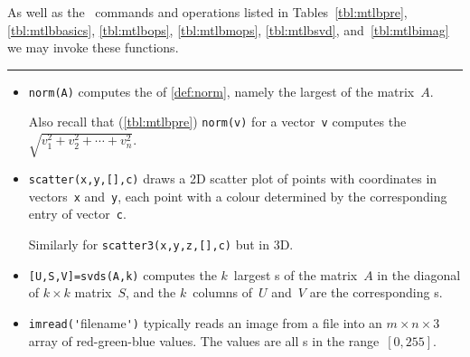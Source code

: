 \begin{table}
\caption{As well as the \script\ commands and operations listed in Tables~\ref{tbl:mtlbpre}, \ref{tbl:mtlbbasics}, \ref{tbl:mtlbops}, \ref{tbl:mtlbmops}, \ref{tbl:mtlbsvd}, and~\ref{tbl:mtlbimag}  we may invoke these functions.} \label{tbl:mtlbnorm}
\hrule
\begin{minipage}{\linewidth}
\begin{itemize}
\item {}\verb|norm(A)| computes the  of \autoref{def:norm}, namely the largest  of the matrix~\(A\).

Also recall that (\autoref{tbl:mtlbpre}) \verb|norm(v)| for a vector~\verb|v| computes the  \(\sqrt{v_1^2+v_2^2+\cdots+v_n^2}\).



\item {}\verb|scatter(x,y,[],c)| draws a 2D scatter plot of points with coordinates in vectors~\verb|x| and~\verb|y|, each point with a colour determined by the corresponding entry of vector~\verb|c|.  

Similarly for \verb|scatter3(x,y,z,[],c)| but in 3D.

\item {}\verb|[U,S,V]=svds(A,k)| computes the \(k\)~largest s of the matrix~\(A\) in the diagonal of \(k\times k\) matrix~\(S\), and the  \(k\)~columns of~\(U\) and~\(V\) are the corresponding s.


\item  {}\verb|imread('|filename\verb|')| typically reads an image from a file into an \(m\times n\times 3\) array of red-green-blue values. 
The values are all s in the range~\([0,255]\).


\end{itemize}
\end{minipage}
\end{table}
